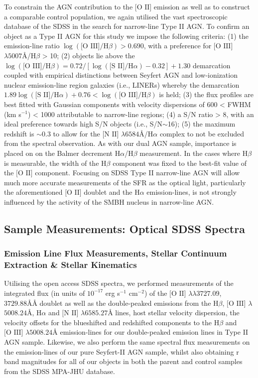 To constrain the AGN contribution to the $\text{[O II]}$ emission as well as to construct a comparable control population, we again utilised the vast spectroscopic database of the SDSS in the search for narrow-line Type II AGN. To confirm an object as a Type II AGN for this study we impose the following criteria: (1) the emission-line ratio $\log(\text{[O III]}/\text{H}\beta)>{0.690}$, with a preference for $\text{[O III]}$ $\lambda{5007}Å$/$\text{H}\beta$ > 10; (2) objects lie above the ${\log{(\text{[O III]}/\text{H}\beta)}}=0.72/[{\log{(\text{[S II]}/\text{H}\alpha)}}-0.32]+1.30$ demarcation coupled with empirical distinctions between Seyfert AGN and low-ionization nuclear emission-line region galaxies (i.e., LINERs) whereby the demarcation ${1.89\log{(\text{[S II]}/\text{H}\alpha)}+0.76}<{\log{(\text{[O III]}/\text{H}\beta)}}$ is held; (3) the flux profiles are best fitted with Gaussian components with velocity dispersions of 600 < FWHM (km s$^{-1}$) < 1000 attributable to narrow-line regions; (4) a S/N ratio > 8, with an ideal preference towards high S/N objects (i.e., S/N$\sim$16); (5) the maximum redshift is $\sim{0.3}$ to allow for the $\text{[N II]}$ $\lambda{6584}Å$/$\text{H}\alpha$ complex to not be excluded from the spectral observation. As with our dual AGN sample, importance is placed on on the Balmer decrement $\text{H}\alpha$/$\text{H}\beta$ measurement. In the cases where $\text{H}\beta$ is measurable, the width of the $\text{H}\beta$ component was fixed to the best-fit value of the $\text{[O II]}$ component. Focusing on SDSS Type II narrow-line AGN will allow much more accurate measurements of the SFR as the optical light, particularly the aforementioned $\text{[O II]}$ doublet and the $\text{H}\alpha$ emission-lines, is not strongly influenced by the activity of the SMBH nucleus in narrow-line AGN.

\subsection{Sample Measurements: Optical SDSS Spectra}

\subsubsection{Emission Line Flux Measurements, Stellar Continuum Extraction \& Stellar Kinematics}

Utilising the open access SDSS spectra, we performed measurements of the integrated flux (in units of $10^{-17}$ erg s$^{-1}$ cm$^{-2}$) of the $\text{[O II]}$ $\lambda\lambda$$3727.09$, $3729.88ÅÅ$ doublet as well as the double-peaked emissions from the $\text{H}\beta$, $\text{[O III]}$ $\lambda$$5008.24Å$, $\text{H}\alpha$ and $\text{[N II]}$ $\lambda$$6585.27Å$ lines, host stellar velocity dispersion, the velocity offsets for the blueshifted and redshifted components to the $\text{H}\beta$ and $\text{[O III]}$ $\lambda$$5008.24Å$ emission-lines for our double-peaked emission lines in Type II AGN sample. Likewise, we also perform the same spectral flux measurements on the emission-lines of our pure Seyfert-II AGN sample, whilst also obtaining r band magnitudes for all of our objects in both the parent and control samples from the SDSS MPA-JHU database. 

